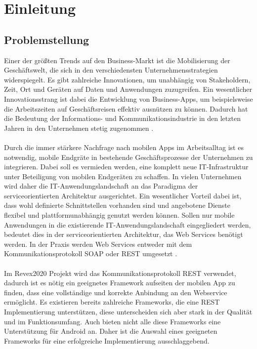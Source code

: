 \chapter{Einleitung}
\label{sec:introduction}

\section{Problemstellung}
Einer der größten Trends auf den Business-Markt ist die Mobilisierung der Geschäftswelt, die sich in den verschiedensten Unternehmensstrategien widerspiegelt. Es gibt zahlreiche Innovationen, um unabhängig von Stakeholdern, Zeit, Ort und Geräten auf Daten und Anwendungen zuzugreifen. Ein wesentlicher Innovationsstrang ist dabei die Entwicklung von Business-Apps, um beispielsweise die Arbeitszeiten auf Geschäftsreisen effektiv ausnützen zu können. Dadurch hat die Bedeutung der Informations- und Kommunikationsindustrie in den letzten Jahren in den Unternehmen stetig zugenommen \cite{smartMobileApps1}.
\\\\
Durch die immer stärkere Nachfrage nach mobilen Apps im Arbeitsalltag ist es notwendig, mobile Endgräte in bestehende Geschäftsprozesse der Unternehmen zu integrieren. Dabei soll es vermieden werden, eine komplett neue IT-Infrastruktur unter Beteiligung von mobilen Endgeräten zu schaffen. In vielen Unternehmen wird daher die IT-Anwendungslandschaft an das Paradigma der serviceorientierten Architektur ausgerichtet. Ein wesentlicher Vorteil dabei ist, dass wohl definierte Schnittstellen vorhanden sind und angebotene Dienste flexibel und plattformunabhängig genutzt werden können. Sollen nur mobile Anwendungen in die existierende IT-Anwendungslandschaft eingegliedert werden, bedeutet dies in der serviceorientierten Architektur, das Web Services benötigt werden. In der Praxis werden Web Services entweder mit dem Kommunikationsprotokoll \acrfull{SOAP} oder \acrfull{REST} umgesetzt \cite{smartMobileApps17}.
\\\\
Im Revex2020 Projekt wird das Kommunikationsprotokoll REST verwendet, dadurch ist es nötig ein geeignetes Framework aufseiten der mobilen App zu finden, dass eine vollständige und korrekte Anbindung an den Webservice ermöglicht. Es existieren bereits zahlreiche Frameworks, die eine REST Implementierung unterstützen, diese unterscheiden sich aber stark in der Qualität und im Funktionsumfang. Auch bieten nicht alle diese Frameworks eine Unterstützung für Android an. Daher ist die Auswahl eines geeigneten Frameworks für eine erfolgreiche Implementierung ausschlaggebend. 

